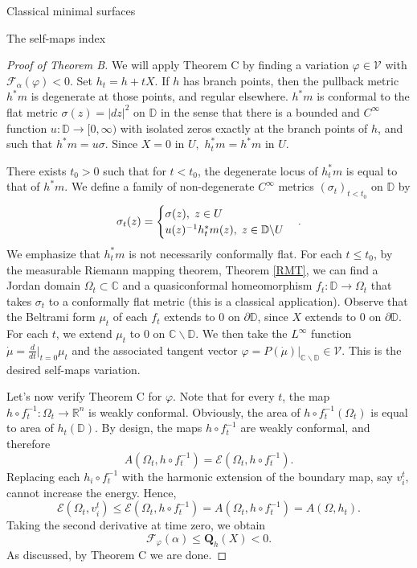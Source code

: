 \documentclass[10pt]{amsart}
\newcommand{\R}{\mathbb R}
\theoremstyle{definition}
\begin{document}
\begin{section}{Classical minimal surfaces}
\begin{subsection}{The self-maps index}
\begin{proof}[Proof of Theorem B]
We will apply Theorem C by finding a variation $\varphi\in\mathcal{V}$ with $\mathcal{F}_\alpha(\varphi)<0$. Set $h_t=h+tX.$ If $h$ has branch points, then the pullback metric $h^*m$ is degenerate at those points, and regular elsewhere. $h^*m$ is conformal to the flat metric $\sigma(z)=|dz|^2$ on $\mathbb{D}$ in the sense that there is a bounded and $C^\infty$ function $u:\mathbb{D}\to [0,\infty)$ with isolated zeros exactly at the branch points of $h$, and such that $h^*m= u\sigma.$ Since $X=0$ in $U,$ $h_t^*m=h^*m$ in $U$.

There exists $t_0>0$ such that for $t<t_0$, the degenerate locus of $h_t^*m$ is equal to that of $h^*m$. We define a family of non-degenerate $C^\infty$ metrics $(\sigma_t)_{t<t_0}$ on $\mathbb{D}$ by
$$\sigma_t(z)=
\begin{cases}
\sigma(z), \hspace{1mm} z\in U\\
u(z)^{-1}h_t^*m(z), \hspace{1mm} z \in\mathbb{D}\backslash U\\
\end{cases}.$$
We emphasize that $h_t^*m$ is not necessarily conformally flat. For each $t\leq t_0$, by the measurable Riemann mapping theorem, Theorem \ref{RMT}, we can find a Jordan domain $\Omega_t\subset \mathbb{C}$ and a quasiconformal homeomorphism $f_t:\mathbb{D}\to\Omega_t$ that takes $\sigma_t$ to a conformally flat metric (this is a classical application). Observe that the Beltrami form $\mu_t$ of each $f_t$ extends to $0$ on $\partial\mathbb{D}$, since $X$ extends to $0$ on $\partial\mathbb{D}.$ For each $t$, we extend $\mu_t$ to $0$ on $\mathbb{C}\backslash\mathbb{D}.$ We then take the $L^\infty$ function $\dot{\mu}=\frac{d}{dt}|_{t=0}\mu_t$ and the associated tangent vector $\varphi=P(\dot{\mu})|_{\mathbb{C}\backslash\mathbb{D}}\in\mathcal{V}.$ This is the desired self-maps variation.

Let's now verify Theorem C for $\varphi$. Note that for every $t$, the map $h\circ f_t^{-1}:\Omega_t\to \R^n$ is weakly conformal. Obviously, the area of $h\circ f_t^{-1}(\Omega_t)$ is equal to area of $h_t(\mathbb{D}).$ By design, the maps $h\circ f_t^{-1}$ are weakly conformal, and therefore
$$A(\Omega_t,h\circ f_t^{-1})=\mathcal{E}(\Omega_t,h\circ f_t^{-1}).$$ Replacing each $h_i\circ f_t^{-1}$ with the harmonic extension of the boundary map, say $v_i^t,$ cannot increase the energy. Hence, $$\mathcal{E}(\Omega_t,v_i^t)\leq \mathcal{E}(\Omega_t, h\circ f_t^{-1})=A(\Omega_t,h\circ f_t^{-1})=A(\Omega,h_t).$$ Taking the second derivative at time zero, we obtain $$\mathcal{F}_\varphi(\alpha)\leq \mathbf{Q}_h(X)<0.$$ As discussed, by Theorem C we are done.
\end{proof}


\end{subsection}
\end{section}
\end{document}
